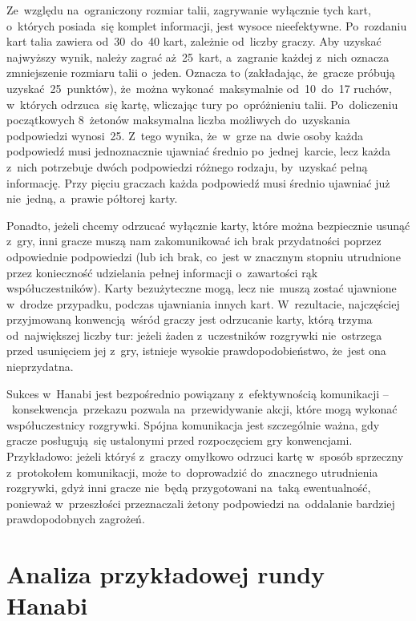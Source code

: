 \documentclass[declaration,shortabstract,inz]{iithesis}
\begin{document}
Ze~względu na~ograniczony rozmiar talii, zagrywanie wyłącznie tych kart, o~których posiada~się komplet informacji, jest wysoce nieefektywne. Po~rozdaniu kart talia zawiera od~30~do~40 kart, zależnie od~liczby graczy. Aby uzyskać najwyższy wynik, należy zagrać aż~25~kart, a~zagranie każdej z~nich oznacza zmniejszenie rozmiaru talii o~jeden. Oznacza to (zakładając, że~gracze próbują uzyskać 25~punktów), że~można wykonać maksymalnie od~10~do~17 ruchów, w~których odrzuca~się kartę, wliczając tury po~opróżnieniu talii. Po~doliczeniu początkowych 8~żetonów maksymalna liczba możliwych do~uzyskania podpowiedzi wynosi~25. Z~tego wynika, że~w~grze na~dwie osoby każda podpowiedź musi jednoznacznie ujawniać średnio po~jednej karcie, lecz każda z~nich potrzebuje dwóch podpowiedzi różnego rodzaju, by~uzyskać pełną informację. Przy pięciu graczach każda podpowiedź musi średnio ujawniać już nie~jedną, a~prawie półtorej karty.

Ponadto, jeżeli chcemy odrzucać wyłącznie karty, które można bezpiecznie usunąć z~gry, inni gracze muszą nam zakomunikować ich brak przydatności poprzez odpowiednie podpowiedzi (lub ich brak, co~jest w znacznym stopniu utrudnione przez konieczność udzielania pełnej informacji o~zawartości rąk współuczestników). Karty bezużyteczne mogą, lecz nie~muszą zostać ujawnione w~drodze przypadku, podczas ujawniania innych kart. W~rezultacie, najczęściej przyjmowaną konwencją wśród graczy jest odrzucanie karty, którą trzyma od~największej liczby tur: jeżeli żaden z~uczestników rozgrywki nie~ostrzega przed usunięciem jej z~gry, istnieje wysokie prawdopodobieństwo, że~jest ona nieprzydatna.

Sukces w~Hanabi jest bezpośrednio powiązany z~efektywnością komunikacji --~konsekwencja przekazu pozwala na~przewidywanie akcji, które mogą wykonać współuczestnicy rozgrywki. Spójna komunikacja jest szczególnie ważna, gdy gracze posługują~się ustalonymi przed rozpoczęciem gry konwencjami. Przykładowo: jeżeli któryś z~graczy omyłkowo odrzuci kartę w~sposób sprzeczny z~protokołem komunikacji, może to~doprowadzić do~znacznego utrudnienia rozgrywki, gdyż inni gracze nie~będą przygotowani na~taką ewentualność, ponieważ w~przeszłości przeznaczali żetony podpowiedzi na~oddalanie bardziej prawdopodobnych zagrożeń.

\section{Analiza przykładowej rundy Hanabi}
\end{document}
